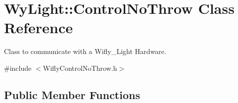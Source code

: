 \hypertarget{class_wy_light_1_1_control_no_throw}{\section{Wy\-Light\-:\-:Control\-No\-Throw Class Reference}
\label{class_wy_light_1_1_control_no_throw}
}


Class to communicate with a Wifly\-\_\-\-Light Hardware.  




{\ttfamily \#include $<$Wifly\-Control\-No\-Throw.\-h$>$}

\subsection*{Public Member Functions}
